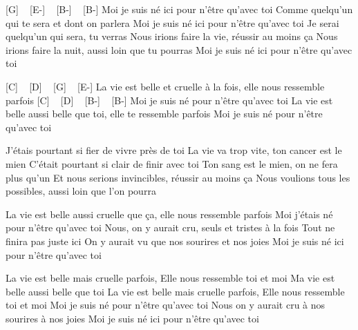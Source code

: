 [G] ~ [E-] ~ [B-] ~ [B-]
Moi je suis né ici pour n'être qu'avec toi
Comme quelqu'un qui te sera et dont on parlera
Moi je suis né ici pour n'être qu'avec toi
Je serai quelqu'un qui sera, tu verras
Nous irions faire la vie, réussir au moins ça
Nous irions faire la nuit, aussi loin que tu pourras
Moi je suis né ici pour n'être qu'avec toi

[C] ~ [D] ~ [G] ~ [E-]
La vie est belle et cruelle à la fois, elle nous ressemble parfois
[C] ~ [D] ~ [B-] ~ [B-]
Moi je suis né pour n'être qu'avec toi
La vie est belle aussi belle que toi, elle te ressemble parfois
Moi je suis né pour n'être qu'avec toi

J'étais pourtant si fier de vivre près de toi
La vie va trop vite, ton cancer est le mien
C'était pourtant si clair de finir avec toi
Ton sang est le mien, on ne fera plus qu'un
Et nous serions invincibles, réussir au moins ça
Nous voulions tous les possibles, aussi loin que l'on pourra


La vie est belle aussi cruelle que ça, elle nous ressemble parfois
Moi j'étais né pour n'être qu'avec toi
Nous, on y aurait cru, seuls et tristes à la fois
Tout ne finira pas juste ici
On y aurait vu que nos sourires et nos joies
Moi je suis né ici pour n'être qu'avec toi

La vie est belle mais cruelle parfois,
Elle nous ressemble toi et moi
Ma vie est belle aussi belle que toi
La vie est belle mais cruelle parfois,
Elle nous ressemble toi et moi
Moi je suis né pour n'être qu'avec toi
Nous on y aurait cru à nos sourires à nos joies
Moi je suis né ici pour n'être qu'avec toi 
